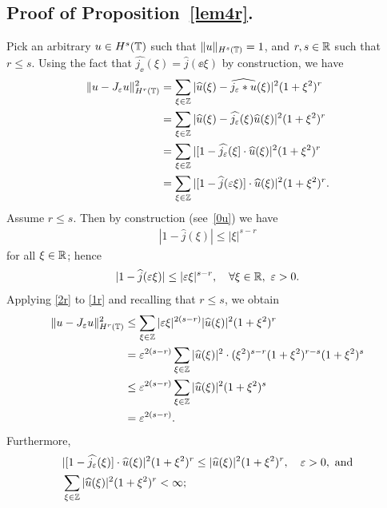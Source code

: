 \subsection{Proof of Proposition~\ref{lem4r}.}
Pick an arbitrary $u \in H^s(\mathbb{T})$ such that $\|u\|_{H^s(\mathbb{T})} = 1$, and $r, s \in \mathbb{R}$ such that $r \le s$. Using the fact that
$\widehat{j_\ee}(\xi) = \widehat{j}(\ee \xi)$ by construction, we have 
\begin{equation}
\begin{split}
\|u - J_\varepsilon u\|_{H^r(\mathbb{T})}^2 
& = \sum_{\xi \in \mathbb{Z}} |\widehat{u}(\xi) - \widehat{j_\varepsilon * u}(\xi) |^2
(1+\xi^2)^r
\\
& = \sum_{\xi \in \mathbb{Z}} |\widehat{u}(\xi) - \widehat{j_\varepsilon}(\xi)
\widehat{u}(\xi) |^2 (1+\xi^2)^r
\\
& = \sum_{\xi \in \mathbb{Z}} | [1- \widehat{j_\varepsilon}(\xi] \cdot \widehat{u}(\xi) |^2
(1+\xi^2)^r
\\
& = \sum_{\xi \in \mathbb{Z}} | [1- \widehat{j}(\varepsilon \xi)] \cdot \widehat{u}(\xi) |^2
(1+\xi^2)^r.
\label{1r}
\end{split}
\end{equation}
Assume $r \le s$. Then by construction (see~\ref{0u}) we have
\begin{equation*}
\begin{split}
|1 - \widehat{j } (\xi) | \le |\xi|^{s-r}
\end{split}
\end{equation*}
for all $\xi \in \mathbb{R}$; hence
\begin{equation}
\begin{split}
|1 - \widehat{j}(\varepsilon \xi)| \le |\varepsilon \xi |^{s-r}, \quad \forall
\xi \in \mathbb{R}, \ \varepsilon > 0.
\label{2r}
\end{split}
\end{equation}
Applying \eqref{2r} to \eqref{1r} and recalling that $r \le s$, we obtain
\begin{equation}
\label{2pr}
\begin{split}
\|u - J_\varepsilon u\|_{H^r(\mathbb{T})}^2 
& \le \sum_{\xi \in \mathbb{Z}}  |\varepsilon \xi |^{2(s-r)}
|\widehat{u}(\xi)|^2 (1 + \xi^2)^r
\\
& = \varepsilon^{2(s-r)} \sum_{\xi \in \mathbb{Z}} |\widehat{u}(\xi)|^2  \cdot (\xi^2)^{s-r}
(1 + \xi^2)^{r-s} (1 + \xi^2)^{s}
\\
& \le \varepsilon^{2(s-r)}
\sum_{\xi \in \mathbb{Z}} |\widehat{u}(\xi)|^2 (1 + \xi^2)^s
\\
& =  \varepsilon^{2(s-r)}.
\end{split}
\end{equation}
Furthermore,
\begin{equation*}
\begin{split}
& |[1- \widehat{j_\varepsilon}(\xi)] \cdot \widehat{u}(\xi)|^2 (1 + \xi^2)^r \le
|\widehat{u}(\xi)|^2 (1 + \xi^2)^r, \quad \varepsilon > 0, \ \text{and}
\\
& \sum_{\xi \in \mathbb{Z}} |\widehat{u}(\xi)|^2 (1 + \xi^2)^r < \infty;
\end{split}
\end{equation*}
